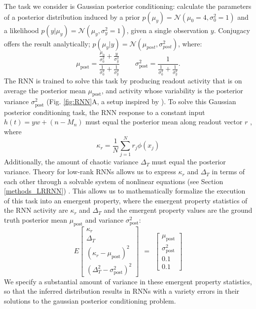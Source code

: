 \documentclass[11pt]{article}
\begin{document}
The task we consider is Gaussian posterior conditioning: calculate the parameters of a posterior distribution induced by a prior $p(\mu_y) = \mathcal{N}(\mu_0=4, \sigma_0^2=1)$ and a likelihood $p(y | \mu_y) = \mathcal{N}(\mu_y,\sigma^2_y = 1)$, given a single observation $y$.  Conjugacy offers the result analytically; $p(\mu_y | y ) = \mathcal{N}\left(\mu_{post},\sigma_{post}^2\right)$, where:   
\begin{equation}
\mu_{\text{post}} = \frac{\frac{\mu_0}{\sigma_0^2} + \frac{y}{\sigma_y^2}}{\frac{1}{\sigma_0^2} + \frac{1}{\sigma_y^2}}
~~~~~~~~~~
 \sigma^2_{\text{post}} = \frac{1}{\frac{1}{\sigma_0^2} + \frac{1}{\sigma_y^2}}.
\end{equation} 
The RNN is trained to solve this task by producing readout activity that is on average the posterior mean $\mu_{\text{post}}$, and activity whose variability is the posterior variance $\sigma^2_{\text{post}}$ (Fig. \ref{fig:RNN}A, a setup inspired by \cite{echeveste2019cortical}). 
To solve this Gaussian posterior conditioning task, the RNN response to a constant input $h(t) = y w + (n-M_n)$ must equal the posterior mean along readout vector $r$ , where
\begin{equation}
\kappa_r =  \frac{1}{N} \sum_{j=1}^N r_j \phi(x_j)
\end{equation}
Additionally, the amount of chaotic variance $\Delta_T$ must equal the posterior variance.
Theory for low-rank RNNs allows us to express $\kappa_r$ and $\Delta_T$ in terms of each other through a solvable system of nonlinear equations  (see Section \ref{methods_LRRNN}) \cite{mastrogiuseppe2018linking}.
This allows us to mathematically formalize the execution of this task into an emergent property, where the emergent property statistics of the RNN activity are $\kappa_r$ and $\Delta_T$ and the emergent property values are the ground truth posterior mean $\mu_{\text{post}}$ and variance $\sigma^2_{\text{post}}$:
\begin{equation}
E \begin{bmatrix} \kappa_r \\ \Delta_T \\ (\kappa_r-\mu_{\text{post}})^2 \\ (\Delta_T^2-\sigma^2_{\text{post}})^2 \end{bmatrix} ~~=~~ \begin{bmatrix} \mu_{\text{post}} \\ \sigma^2_{\text{post}} \\ 0.1 \\ 0.1 \end{bmatrix}
\end{equation}
We specify a substantial amount of variance in these emergent property statistics, so that the inferred distribution results in RNNs with a variety errors in their solutions to the gaussian posterior conditioning problem. 
\end{document}
